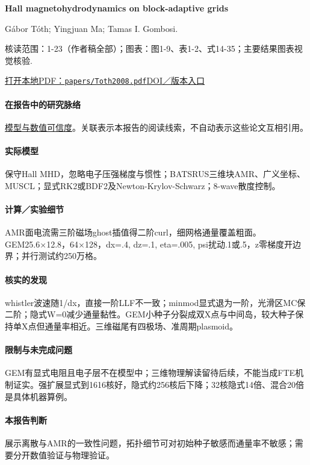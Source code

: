 \textbf{Hall magnetohydrodynamics on block-adaptive grids}\citep{Toth2008}\

Gábor Tóth;  Yingjuan Ma;  Tamas I. Gombosi.

\textsf{核读范围：}1-23（作者稿全部）；\textsf{图表：}图1-9、表1-2、式14-35；主要结果图表视觉核验.

\href{run:papers/Toth2008.pdf}{打开本地PDF：\texttt{papers/Toth2008.pdf}}\quad\href{https://doi.org/10.1016/j.jcp.2008.04.010}{DOI／版本入口}

\paragraph{在报告中的研究脉络}\hyperref[ch:numerics]{模型与数值可信度}。关联表示本报告的阅读线索，不自动表示这些论文互相引用。

\paragraph{实际模型}保守Hall MHD，忽略电子压强梯度与惯性；BATSRUS三维块AMR、广义坐标、MUSCL；显式RK2或BDF2及Newton-Krylov-Schwarz；8-wave散度控制。

\paragraph{计算／实验细节}AMR面电流需三阶磁场ghost插值得二阶curl，细网格通量覆盖粗面。GEM25.6×12.8，64×128，dx=.4, dz=.1, eta=.005, psi扰动.1或.5，z零梯度开边界；并行测试约250万格。

\paragraph{核实的发现}whistler波速随1/dx，直接一阶LLF不一致；minmod显式退为一阶，光滑区MC保二阶；隐式W=0减少通量黏性。GEM小种子分裂成双X点与中间岛，较大种子保持单X点但通量率相近。三维磁尾有四极场、准周期plasmoid。

\paragraph{限制与未完成问题}GEM有显式电阻且电子层不在模型中；三维物理解读留待后续，不能当成FTE机制证实。强扩展显式到1616核好，隐式约256核后下降；32核隐式14倍、混合20倍是具体机器算例。

\paragraph{本报告判断}展示离散与AMR的一致性问题，拓扑细节可对初始种子敏感而通量率不敏感；需要分开数值验证与物理验证。

